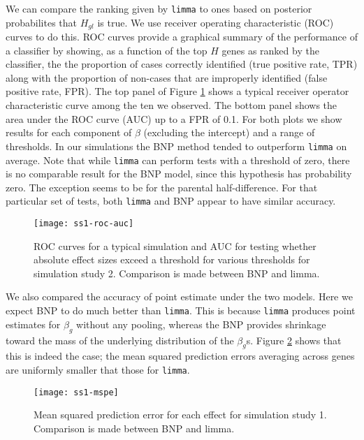 We can compare the ranking given by \texttt{limma} to ones based on posterior probabilites that $H_{gl}$ is true. We use receiver operating characteristic (ROC) curves to do this. ROC curves provide a graphical summary of the performance of a classifier by showing, as a function of the top $H$ genes as ranked by the classifier, the the proportion of cases correctly identified (true positive rate, TPR) along with the proportion of non-cases that are improperly identified (false positive rate, FPR). The top panel of Figure \ref{roc-ss1} shows a typical receiver operator characteristic curve among the ten we observed. The bottom panel shows the area under the ROC curve (AUC) up to a FPR of 0.1. For both plots we show results for each component of $\beta$ (excluding the intercept) and a range of thresholds. In our simulations the BNP method tended to outperform \texttt{limma} on average. Note that while \texttt{limma} can perform tests with a threshold of zero, there is no comparable result for the BNP model, since this hypothesis has probability zero. The exception seems to be for the parental half-difference. For that particular set of tests, both \texttt{limma} and BNP appear to have similar accuracy.
% 
\begin{figure}[ht!]
\centering
\texttt{[image: ss1-roc-auc]}
\caption{ROC curves for a typical simulation and AUC for testing whether absolute effect sizes exceed a threshold for various thresholds for simulation study 2. Comparison is made between BNP and limma.}
\label{roc-ss1}
\end{figure}

We also compared the accuracy of point estimate under the two models. Here we expect BNP to do much better than \texttt{limma}. This is because \texttt{limma} produces point estimates for $\beta_g$ without any pooling, whereas the BNP provides shrinkage toward the mass of the underlying distribution of the $\beta_g$s. Figure \ref{mspe-ss1} shows that this is indeed the case; the mean squared prediction errors averaging across genes are uniformly smaller that those for \texttt{limma}.

\begin{figure}[ht!]
\centering
\texttt{[image: ss1-mspe]}
\begin{minipage}{.8\textwidth}
\caption{\small Mean squared prediction error for each effect for simulation study 1. Comparison is made between BNP and limma.}
\end{minipage}
\label{mspe-ss1}
\end{figure}

